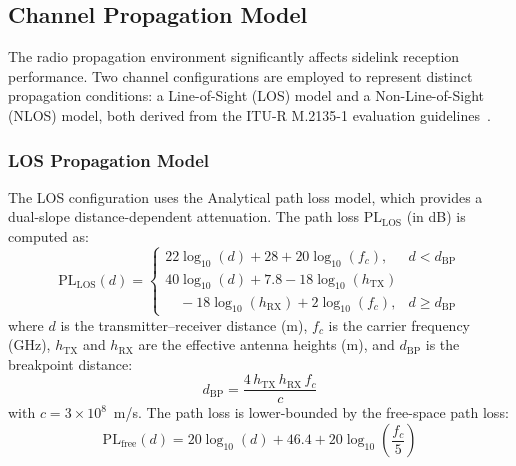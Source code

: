 \documentclass[letterpaper,journal]{IEEEtran}
\begin{document}
\subsection{Channel Propagation Model}
\label{sec:channel_model}

The radio propagation environment significantly affects sidelink reception performance. Two channel configurations are employed to represent distinct propagation conditions: a Line-of-Sight (LOS) model and a Non-Line-of-Sight (NLOS) model, both derived from the ITU-R M.2135-1 evaluation guidelines~\cite{itur_m2135}.

\subsubsection{LOS Propagation Model}

The LOS configuration uses the Analytical path loss model, which provides a dual-slope distance-dependent attenuation. The path loss $\text{PL}_\text{LOS}$ (in dB) is computed as:
\begin{equation}
    \text{PL}_\text{LOS}(d) \!=\! \begin{cases}
    22 \log_{10}(d) + 28 + 20\log_{10}(f_c), & d < d_\text{BP} \\[4pt]
    40\log_{10}(d) + 7.8 - 18\log_{10}(h_\text{TX}) & \\
    \quad - 18\log_{10}(h_\text{RX}) + 2\log_{10}(f_c), & d \geq d_\text{BP}
    \end{cases}
    \label{eq:pl_los}
\end{equation}
where $d$ is the transmitter--receiver distance (m), $f_c$ is the carrier frequency (GHz), $h_\text{TX}$ and $h_\text{RX}$ are the effective antenna heights (m), and $d_\text{BP}$ is the breakpoint distance:
\begin{equation}
    d_\text{BP} = \frac{4 \, h_\text{TX} \, h_\text{RX} \, f_c}{c}
    \label{eq:breakpoint}
\end{equation}
with $c = 3 \times 10^8$~m/s. The path loss is lower-bounded by the free-space path loss:
\begin{equation}
    \text{PL}_\text{free}(d) = 20\log_{10}(d) + 46.4 + 20\log_{10}\!\left(\frac{f_c}{5}\right)
    \label{eq:pl_free}
\end{equation}
\end{document}

